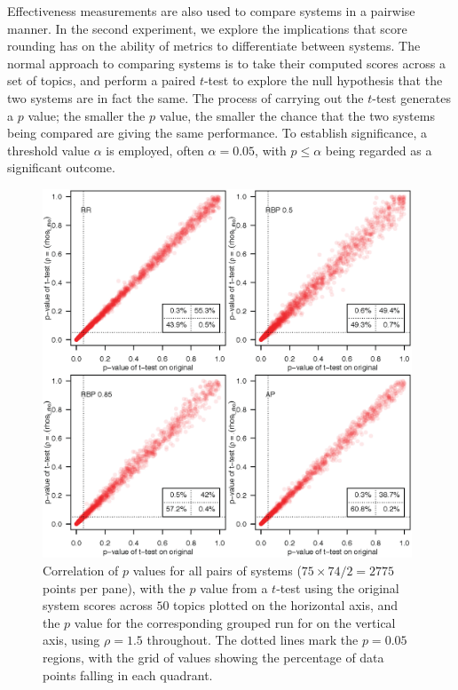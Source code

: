 
Effectiveness measurements are also used to compare systems in a
pairwise manner.
In the second experiment, we explore the implications that score
rounding has on the ability of metrics to differentiate between
systems.
The normal approach to comparing systems is to take their computed
scores across a set of topics, and perform a paired $t$-test to
explore the null hypothesis that the two systems are in fact the
same.
The process of carrying out the $t$-test generates a $p$ value; the
smaller the $p$ value, the smaller the chance that the two systems
being compared are giving the same performance.
To establish significance, a threshold value $\alpha$ is employed,
often $\alpha=0.05$, with $p\le\alpha$ being regarded as a
significant outcome.

\begin{figure}[t!]
\centering
\includegraphics[width=0.98\textwidth]{tmp-fig-03.png}
\caption{Correlation of $p$ values for all pairs of systems
($75\times74/2=2775$ points per pane), with the $p$ value from a
$t$-test using the original system scores across $50$ topics plotted
on the horizontal axis, and the $p$ value for the corresponding
grouped run for on the vertical axis, using $\rho=1.5$ throughout.
The dotted lines mark the $p=0.05$ regions, with the grid of values
showing the percentage of data points falling in each quadrant.
\label{fig-pair-variation}}
\end{figure}

